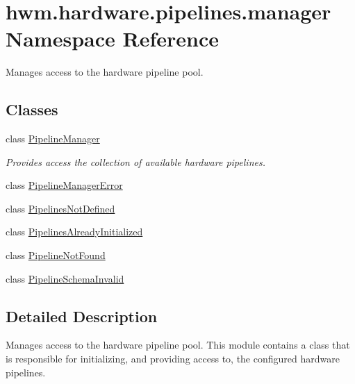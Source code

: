 \hypertarget{namespacehwm_1_1hardware_1_1pipelines_1_1manager}{\section{hwm.\-hardware.\-pipelines.\-manager Namespace Reference}
\label{namespacehwm_1_1hardware_1_1pipelines_1_1manager}
}


Manages access to the hardware pipeline pool.  


\subsection*{Classes}
\begin{DoxyCompactItemize}
\item 
class \hyperlink{classhwm_1_1hardware_1_1pipelines_1_1manager_1_1_pipeline_manager}{Pipeline\-Manager}
\begin{DoxyCompactList}\small\item\em Provides access the collection of available hardware pipelines. \end{DoxyCompactList}\item 
class \hyperlink{classhwm_1_1hardware_1_1pipelines_1_1manager_1_1_pipeline_manager_error}{Pipeline\-Manager\-Error}
\item 
class \hyperlink{classhwm_1_1hardware_1_1pipelines_1_1manager_1_1_pipelines_not_defined}{Pipelines\-Not\-Defined}
\item 
class \hyperlink{classhwm_1_1hardware_1_1pipelines_1_1manager_1_1_pipelines_already_initialized}{Pipelines\-Already\-Initialized}
\item 
class \hyperlink{classhwm_1_1hardware_1_1pipelines_1_1manager_1_1_pipeline_not_found}{Pipeline\-Not\-Found}
\item 
class \hyperlink{classhwm_1_1hardware_1_1pipelines_1_1manager_1_1_pipeline_schema_invalid}{Pipeline\-Schema\-Invalid}
\end{DoxyCompactItemize}


\subsection{Detailed Description}
Manages access to the hardware pipeline pool. This module contains a class that is responsible for initializing, and providing access to, the configured hardware pipelines. 